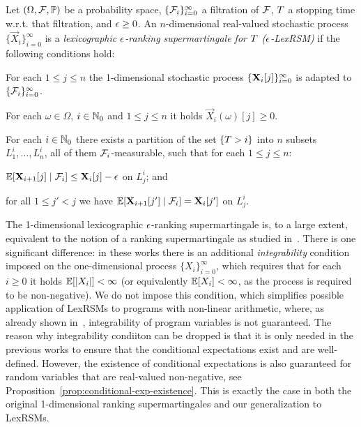\begin{definition}
\label{def:lexrsm}
Let $(\Omega,\mathcal{F},\mathbb{P})$ be a probability space, 
$\{\mathcal{F}_i\}_{i=0}^{\infty}$ a filtration of $\mathcal{F}$, $T$ a stopping 
time w.r.t. that filtration, and 
$\epsilon\geq 0$. 
An $n$-dimensional real-valued stochastic process 
$\{\vec{X}_{i}\}_{i=0}^{\infty}$ is a 
\emph{lexicographic $\epsilon$-ranking supermartingale for $T$ 
($\epsilon$-LexRSM)} if the 
following 
conditions hold:
\begin{compactenum}
\item For each $1\leq j \leq n$ the 1-dimensional stochastic process 
$\{\mathbf{X}_{i}[j]\}_{i=0}^{\infty}$ is adapted to 
$\{\mathcal{F}_i\}_{i=0}^{\infty}$.
\item For each $\omega \in \Omega$, $i\in \mathbb{N}_0$ and $1\leq j \leq n$ it holds 
$\vec{X}_i (\omega)[j]\geq {0}$. %
\item For each $i\in \mathbb{N}_0$ there exists a partition of the set $\{T>i\}$ into $n$ subsets $L^i_1,\dots,L^i_n$, all of them $\mathcal{F}_i$-measurable, such that for each $1\leq j \leq n$:
\begin{compactitem}
	\item $\mathbb{E}[\mathbf{X}_{i+1}[j]\mid 
	\mathcal{F}_i]\leq\mathbf{X}_{i}[j] - 
	\epsilon$ on $L_j^i$; and
	\item for all $1 \leq j' < j$ we have $\mathbb{E}[\mathbf{X}_{i+1}[j']\mid 
	\mathcal{F}_i]=\mathbf{X}_{i}[j']$ on $L_{j}^i$.
\end{compactitem}
\end{compactenum}
\end{definition}

The 1-dimensional lexicographic $\epsilon$-ranking supermartingale is, to a large extent, equivalent to the notion of a ranking supermartingale as studied in~\cite{HolgerPOPL,CFNH16:prob-termination}. There is one significant difference: in these works there is an additional \emph{integrability} condition imposed on the one-dimensional process $\{X_i\}_{i=0}^{\infty}$, which requires that for each $i\geq 0$ it holds $\mathbb{E}[|X_i|]<\infty$ (or equivalently $\mathbb{E}[X_i]<\infty$, as the process is required to be non-negative). We do not impose this condition, which simplifies possible application of LexRSMs to programs with non-linear arithmetic, where, as already shown in~\cite{HolgerPOPL}, integrability of program variables is not guaranteed.
The reason why integrability condiiton can be dropped is that it is only needed in the previous works to ensure that the conditional expectations exist and are well-defined. However, the existence of conditional expectations is also guaranteed for random variables that are real-valued non-negative, see Proposition~\ref{prop:conditional-exp-existence}. This is exactly the case in both the original 1-dimensional ranking supermartingales and our generalization to LexRSMs. 

